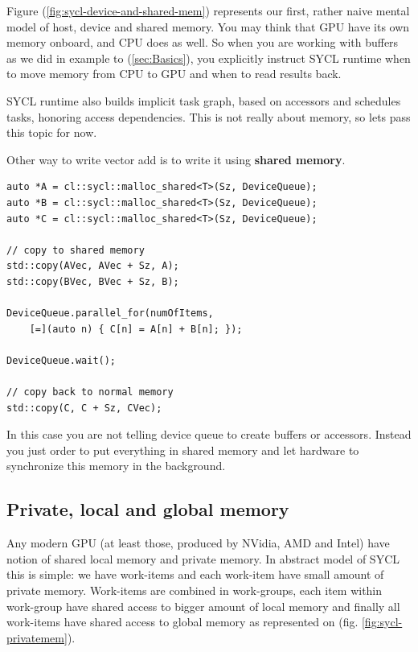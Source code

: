 \documentclass[a4paper,12pt,oneside]{article}
\begin{document}
Figure (\ref{fig:sycl-device-and-shared-mem}) represents our first, rather naive mental model of host, device and shared memory. You may think that GPU have its own memory onboard, and CPU does as well. So when you are working with buffers as we did in example to (\ref{sec:Basics}), you explicitly instruct SYCL runtime when to move memory from CPU to GPU and when to read results back.

SYCL runtime also builds implicit task graph, based on accessors and schedules tasks, honoring access dependencies. This is not really about memory, so lets pass this topic for now.

Other way to write vector add is to write it using \textbf{shared memory}.

\begin{lstlisting}[caption={Vector addition in shared memory},label={lst:vectoraddshared}]
auto *A = cl::sycl::malloc_shared<T>(Sz, DeviceQueue);
auto *B = cl::sycl::malloc_shared<T>(Sz, DeviceQueue);
auto *C = cl::sycl::malloc_shared<T>(Sz, DeviceQueue);

// copy to shared memory
std::copy(AVec, AVec + Sz, A);
std::copy(BVec, BVec + Sz, B);

DeviceQueue.parallel_for(numOfItems,
    [=](auto n) { C[n] = A[n] + B[n]; });

DeviceQueue.wait();

// copy back to normal memory
std::copy(C, C + Sz, CVec);
\end{lstlisting}

In this case you are not telling device queue to create buffers or accessors. Instead you just order to put everything in shared memory and let hardware to synchronize this memory in the background.


\subsection{Private, local and global memory}\label{subsec:PrivLocal}


Any modern GPU (at least those, produced by NVidia, AMD and Intel) have notion of shared local memory and private memory. In abstract model of SYCL this is simple: we have work-items and each work-item have small amount of private memory. Work-items are combined in work-groups, each item within work-group have shared access to bigger amount of local memory and finally all work-items have shared access to global memory as represented on (fig. \ref{fig:sycl-privatemem}).
\end{document}
